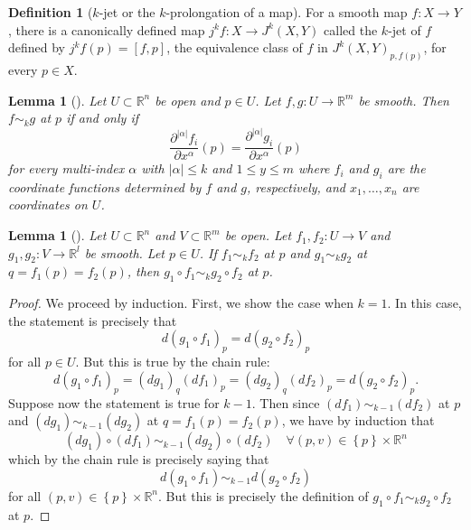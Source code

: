 \documentclass[reqno]{amsart}
\newtheorem{lemma}[theorem]{Lemma}
\theoremstyle{definition}
\newtheorem{definition}[theorem]{Definition}
\theoremstyle{remark}
\begin{document}
\begin{definition}[$k$-jet or the $k$-prolongation of a map]
    For a smooth map
    $f \colon X \to Y$, there is a canonically defined map
    $j^{k}f \colon X \to J^{k}(X,Y)$ called the
    $k$-jet of $f$ defined by
    $j^{k}f(p) = \left[ f, p \right] $, the
    equivalence class of $f$ in
    $J^{k}(X,Y)_{p, f(p)}$, for every
    $p \in X$.
\end{definition}

\begin{lemma}[]\label{Jets-Taylor-Series}
    Let $U \subset \mathbb{R}^{n}$ be open and
    $p \in U$. Let $f,g \colon U \to \mathbb{R}^{m}$ be
    smooth. Then
    $f \sim_k g$ at $p$ if and only if
    \[
    \frac{\partial^{\left| \alpha \right| } f_i}{\partial
    x^{\alpha}}(p) = \frac{\partial^{\left| \alpha \right| }
g_i}{\partial x^{\alpha}}(p)
    \]
    for every multi-index $\alpha$ with
    $\left| \alpha \right| \le k$ and
    $1\le y \le m$ where $f_i$ and $g_i$ are the
    coordinate functions determined by
    $f$ and $g$, respectively, and $x_1, \ldots, x_n$
    are coordinates on $U$.
\end{lemma}



\begin{lemma}[]
    Let $U \subset \mathbb{R}^{n}$ and
    $V \subset \mathbb{R}^{m}$ be open.
    Let $f_1,f_2 \colon U \to V$ and
    $g_1,g_2 \colon V \to \mathbb{R}^{l}$ be smooth.
    Let $p \in U$.
    If $f_1 \sim_k f_2$ at $p$ and
    $g_1 \sim_k g_2$ at $q = f_1(p) = f_2(p)$, then
    $g_1 \circ f_1 \sim_k g_2 \circ f_2$ at $p$.
\end{lemma}

\begin{proof}
    We proceed by induction. First, we show the case
    when $k = 1$. In this case, the statement is precisely that
    \[
    d \left( g_1 \circ f_1 \right)_p = d\left( g_2
    \circ f_2\right)_p
    \]
    for all $p \in U$.
    But this is true by the chain rule:
    \[
    d\left( g_1 \circ f_1 \right)_p =
    \left( dg_1 \right)_q \left( df_1 \right)_p
    = \left( dg_2 \right)_q \left( df_2 \right)_p
    = d\left( g_2 \circ f_2 \right)_p.
    \]
    Suppose now the statement is
    true for $k-1$.
    Then since
    $(df_1) \sim_{k-1} \left( df_2 \right) $ at
    $p$ and $\left( dg_1 \right) \sim_{k-1} \left( dg_2 \right) $
    at $q = f_1(p) = f_2(p)$, we have by
    induction that
    \[
        \left( dg_1  \right) \circ \left( df_1 \right)
        \sim_{k-1} \left( dg_2 \right) \circ
        \left( df_2 \right) \quad
        \forall \left( p,v \right) \in \left\{ p \right\} \times
        \mathbb{R}^{n}
    \]
    which by the chain rule is precisely saying that
    \[
    d\left( g_1 \circ f_1 \right) \sim_{k-1}
    d\left( g_2 \circ f_2 \right)
    \]
    for all $(p,v) \in \left\{ p \right\} \times \mathbb{R}^{n}$.
    But this is precisely the definition of
    $g_1 \circ f_1 \sim_k g_2 \circ f_2$ at
    $p$.

\end{proof}
\end{document}
